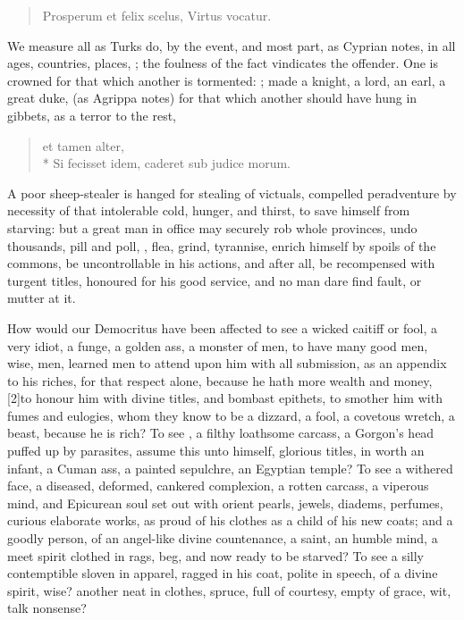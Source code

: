 {\begin{latin}
\begin{verse}%
Prosperum et felix scelus,
Virtus vocatur.
\end{verse}%
\end{latin}
\translationrule
{}
%
%

We measure all as Turks do, by the event, and most part, as Cyprian
notes, in all ages, countries, places, ; the foulness of the fact vindicates the offender.
One is crowned for that which another is tormented: ; made a knight, a lord, an earl, a
great duke, (as Agrippa notes) for that which another should have
hung in gibbets, as a terror to the rest,
%
\begin{latin}
\begin{verse}
et tamen alter,\\*
Si fecisset idem, caderet sub judice morum.
\end{verse}
\end{latin}
%
%
A poor sheep-stealer is hanged for stealing of victuals, compelled
peradventure by necessity of that intolerable cold, hunger, and thirst,
to save himself from starving: but a great man in office may
securely rob whole provinces, undo thousands, pill and poll, , flea, grind, tyrannise, enrich himself by spoils of the
commons, be uncontrollable in his actions, and after all, be
recompensed with turgent titles, honoured for his good service, and no
man dare find fault, or mutter at it.

How would our Democritus have been affected to see a wicked caitiff or
fool, a very idiot, a funge, a golden ass, a monster of men, to
have many good men, wise, men, learned men to attend upon him with all
submission, as an appendix to his riches, for that respect alone,
because he hath more wealth and money, [2\baselineskip]to honour him with divine
titles, and bombast epithets, to smother him with fumes and eulogies,
whom they know to be a dizzard, a fool, a covetous wretch, a beast, \etc{}
because he is rich? To see , a filthy
loathsome carcass, a Gorgon's head puffed up by parasites, assume this
unto himself, glorious titles, in worth an infant, a Cuman ass, a
painted sepulchre, an Egyptian temple? To see a withered face, a
diseased, deformed, cankered complexion, a rotten carcass, a viperous
mind, and Epicurean soul set out with orient pearls, jewels, diadems,
perfumes, curious elaborate works, as proud of his clothes as a child
of his new coats; and a goodly person, of an angel-like divine
countenance, a saint, an humble mind, a meet spirit clothed in rags,
beg, and now ready to be starved? To see a silly contemptible sloven in
apparel, ragged in his coat, polite in speech, of a divine spirit,
wise? another neat in clothes, spruce, full of courtesy, empty of
grace, wit, talk nonsense?

}
